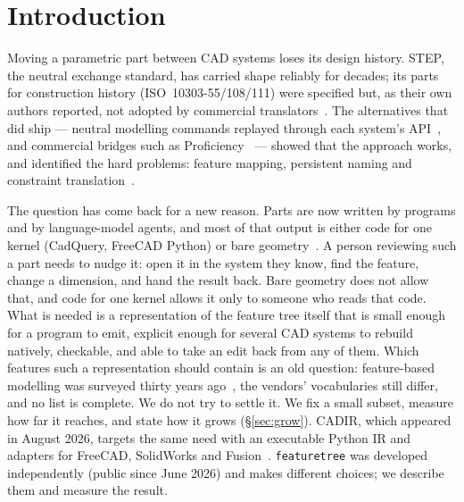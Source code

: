 \documentclass[11pt]{article}
\newcommand{\code}[1]{\texttt{\small #1}}
\begin{document}
\section{Introduction}

Moving a parametric part between CAD systems loses its design history. STEP,
the neutral exchange standard, has carried shape reliably for decades; its parts
for construction history (ISO~10303-55/108/111) were specified but, as their own
authors reported, not adopted by commercial translators~\cite{TODO-pratt-kim}.
The alternatives that did ship --- neutral modelling commands replayed through
each system's API~\cite{TODO-mun-han,safdar2020macroparametric}, and commercial
bridges such as Proficiency~\cite{TODO-rappoport} --- showed that the approach
works, and identified the hard problems: feature mapping, persistent naming and
constraint translation~\cite{safdar2020macroparametric}.

The question has come back for a new reason. Parts are now written by programs
and by language-model agents, and most of that output is either code for one
kernel (CadQuery, FreeCAD Python) or bare geometry~\cite{alrashedy2025cadcodeverify,rukhovich2025cadrecode,wu2021deepcad}.
A person reviewing such a part needs to nudge it: open it in the system they
know, find the feature, change a dimension, and hand the result back. Bare
geometry does not allow that, and code for one kernel allows it only to someone
who reads that code. What is needed is a representation of the feature tree
itself that is small enough for a program to emit, explicit enough for several
CAD systems to rebuild natively, checkable, and able to take an edit back from
any of them. Which features such a representation should contain is an old
question: feature-based modelling was surveyed thirty years
ago~\cite{shah1991assessment,salomons1993review}, the vendors' vocabularies
still differ, and no list is complete. We do not try to settle it. We fix a
small subset, measure how far it reaches, and state how it grows
(\S\ref{sec:grow}). CADIR, which
appeared in August 2026, targets the same need with an executable Python IR and
adapters for FreeCAD, SolidWorks and Fusion~\cite{liu2026cadir}.
\code{featuretree} was developed independently (public since June 2026) and makes
different choices; we describe them and measure the result.
\end{document}
